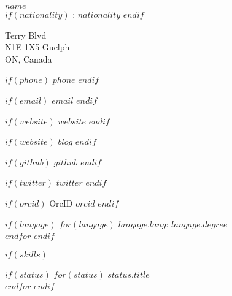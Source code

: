 \documentclass[$fontsize$, letterpaper]{article}
\begin{document}
\begin{multicols}{2}

{\LARGE \textbf{$name$}}\\


$if(nationality)$
: $nationality$
$endif$

\vspace*{.1cm}

\faHome {} Terry Blvd \\ \hspace*{.6cm} N1E 1X5 Guelph \\ \hspace*{.6cm} ON, Canada

$if(phone)$
\faPhone \quad $phone$
$endif$

$if(email)$
\faEnvelope \quad \href{mailto:$email$}{$email$}
$endif$

$if(website)$
\faGlobe \quad \href{http://$website$}{$website$}
$endif$

$if(website)$
\faGlobe \quad \href{http://$blog$}{$blog$}
$endif$

$if(github)$
\faGithub \quad \href{https://github.com/$github$}{$github$}
$endif$

$if(twitter)$
\faTwitter \quad \href{https://twitter.com/$github$}{$twitter$}
$endif$

$if(orcid)$
OrcID \quad \href{http://orcid.org/$orcid$}{$orcid$}
$endif$

\vspace{.2cm}


$if(langage)$
$for(langage)$
\textbf{$langage.lang$}: $langage.degree$ \\
$endfor$
$endif$


$if(skills)$

\columnbreak


$if(status)$
$for(status)$
{\large\textbf{$status.title$}} \\
$endfor$
$endif$

%




\end{multicols}
\end{document}
